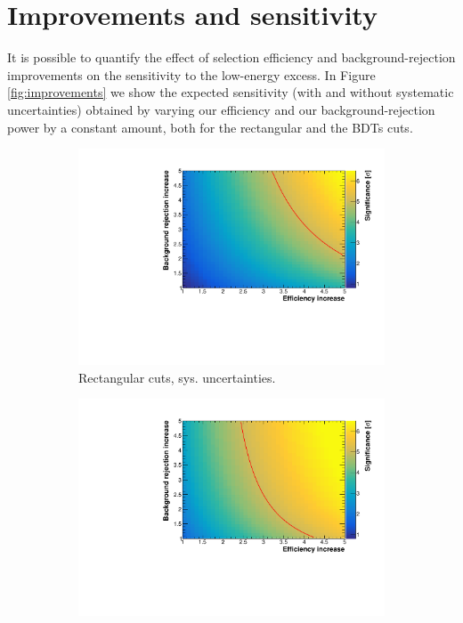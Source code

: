 \section{Improvements and sensitivity}
It is possible to quantify the effect of selection efficiency and background-rejection improvements on the sensitivity to the low-energy excess. In Figure \ref{fig:improvements} we show the expected sensitivity (with and without systematic uncertainties) obtained by varying our efficiency and our background-rejection power by a constant amount, both for the rectangular and the BDTs cuts. 

\begin{figure}[htbp]
  \begin{center}
     \begin{subfigure}{0.48\textwidth}
      \includegraphics[width=\linewidth]{figures/cuts_2d_sys.pdf}
      \caption{Rectangular cuts, sys. uncertainties.}  
    \end{subfigure}\hfill
    \begin{subfigure}{0.48\textwidth}
      \includegraphics[width=\linewidth]{figures/bdt_2d_sys.pdf}

\end{subfigure}
\end{center}
\end{figure}
